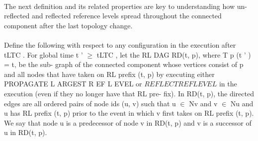 \paragraph{}The next definition and its related properties are key to understanding how un- reflected and reflected reference levels spread throughout the connected component after the last topology change. \paragraph{}Define the following with respect to any configuration in the execution after tLTC . For global time t ' $\geq$ tLTC , let the RL DAG RD(t, p), where T p (t ' ) = t, be the sub- graph of the connected component whose vertices consist of p and all nodes that have taken on RL prefix (t, p) by executing either PROPAGATE L ARGEST R EF L EVEL or $REFLECTREFLEVEL$ in the execution (even if they no longer have that RL pre- fix). In RD(t, p), the directed edges are all ordered pairs of node ids (u, v) such that u $\in$ Nv and v $\in$ Nu and u has RL prefix (t, p) prior to the event in which v first takes on RL prefix (t, p). We say that node u is a predecessor of node v in RD(t, p) and v is a successor of u in RD(t, p).

